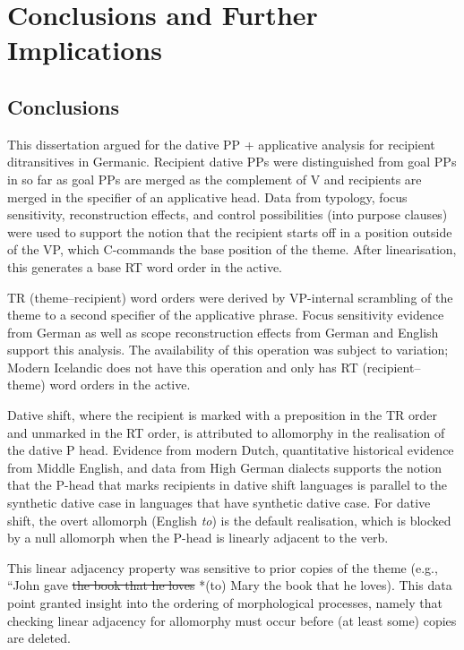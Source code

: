 \chapter{Conclusions and Further Implications}
\section{Conclusions}
This dissertation argued for the dative PP + applicative analysis for recipient ditransitives in Germanic. Recipient dative PPs were distinguished from goal PPs in so far as goal PPs are merged as the complement of V and recipients are merged in the specifier of an applicative head. Data from typology, focus sensitivity, reconstruction effects, and control possibilities (into purpose clauses) were used to support the notion that the recipient starts off in a position outside of the VP, which C-commands the base position of the theme. After linearisation, this generates a base RT word order in the active.

TR (theme--recipient) word orders were derived by VP-internal scrambling of the theme to a second specifier of the applicative phrase. Focus sensitivity evidence from German as well as scope reconstruction effects from German and English support this analysis. The availability of this operation was subject to variation; Modern Icelandic does not have this operation and only has RT (recipient--theme) word orders in the active. 

Dative shift, where the recipient is marked with a preposition in the TR order and unmarked in the RT order, is attributed to allomorphy in the realisation of the dative P head. Evidence from modern Dutch, quantitative historical evidence from Middle English, and data from High German dialects supports the notion that the P-head that marks recipients in dative shift languages is parallel to the synthetic dative case in languages that have synthetic dative case. For dative shift, the overt allomorph (English \textit{to}) is the default realisation, which is blocked by a null allomorph when the P-head is linearly adjacent to the verb.

This linear adjacency property was sensitive to prior copies of the theme (e.g., ``John gave \sout{the book that he loves} *(to) Mary the book that he loves). This data point granted insight into the ordering of morphological processes, namely that checking linear adjacency for allomorphy must occur before (at least some) copies are deleted.

